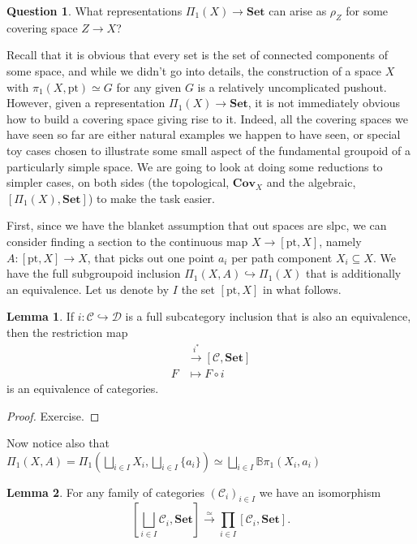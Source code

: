 \documentclass{tufte-handout}
\def\into {\hookrightarrow}
\def\cC {\mathcal{C}}
\def\cD {\mathcal{D}}
\def\pt {\mathrm{pt}}
\def\Set {\mathbf{Set}}
\def\Cov {\mathbf{Cov}}
\theoremstyle{definition}
\newtheorem{lemma}{Lemma}
\newtheorem{q}{Question}
\begin{document}
\begin{q}
What representations $\Pi_1(X) \to \Set$ can arise as $\rho_Z$ for some covering space $Z\to X$?
\end{q}

Recall that it is obvious that every set is the set of connected components of some 
space, and while we didn't go into details, the construction of a space $X$ with 
$\pi_1(X,\pt)\simeq G$ for any given $G$ is a relatively uncomplicated pushout. However, 
given a representation $\Pi_1(X) \to \Set$, it is not immediately obvious how to build a 
covering space giving rise to it. Indeed, all the covering spaces we have seen so far 
are either natural examples we happen to have seen, or special toy cases chosen to 
illustrate some small aspect of the fundamental groupoid of a particularly simple space. 
We are going to look at doing some reductions to simpler cases, on both sides (the 
topological, $\Cov_X$ and the algebraic, $[\Pi_1(X),\Set]$) to make the task easier.

First, since we have the blanket assumption that out spaces are slpc, we can consider 
finding a section to the continuous map $X\to [\pt,X]$, namely $A\colon [\pt,X] \to X$, 
that picks out one point $a_i$ per path component $X_i \subseteq X$. We have the full 
subgroupoid inclusion $\Pi_1(X,A) \into \Pi_1(X)$ that is additionally an 
equivalence. 
Let us denote by $I$ the set $[\pt,X]$ in what follows.

\begin{lemma}
If $i\colon \cC\into \cD$ is a full subcategory inclusion that is also an equivalence, then 
the restriction map
\begin{align*}
[\cD,\Set]& \xrightarrow{i^*} [\cC,\Set]\\
F & \mapsto F\circ i
\end{align*}
is an equivalence of categories.
\end{lemma}

\begin{proof}
Exercise.
\end{proof}

Now notice also that $\Pi_1(X,A) = \Pi_1(\bigsqcup_{i\in I}X_i,\bigsqcup_{i\in I}\{a_i\}) \simeq \bigsqcup_{i\in I} \mathbb{B}\pi_1(X_i,a_i)$

\begin{lemma}
For any family of categories $(\cC_i)_{i\in I}$ we have an isomorphism
\[
	[\bigsqcup_{i\in I} \cC_i,\Set] \xrightarrow{\simeq} \prod_{i\in I}[\cC_i,\Set]. 
\]
\end{lemma}
\end{document}
